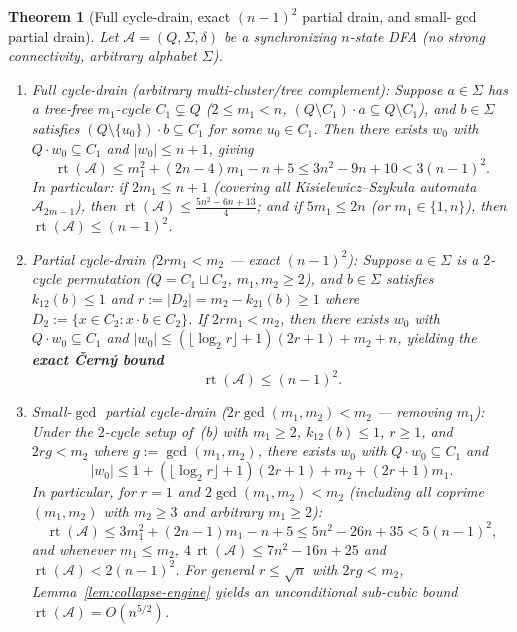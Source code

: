 \documentclass[11pt,a4paper]{article}
\newtheorem{theorem}{Theorem}[section]
\theoremstyle{definition}
\theoremstyle{remark}
\newcommand{\rt}{\operatorname{rt}}
\newcommand{\cA}{\mathcal{A}}
\begin{document}
\begin{theorem}[Full cycle-drain, exact $(n-1)^2$ partial drain, and small-$\gcd$ partial drain]
\label{thm:drain}
Let $\cA = (Q, \Sigma, \delta)$ be a synchronizing $n$-state DFA (no strong connectivity, arbitrary alphabet $\Sigma$).
\begin{enumerate}[label=(\alph*)]
  \item \emph{Full cycle-drain (arbitrary multi-cluster/tree complement):} Suppose $a \in \Sigma$ has a tree-free $m_1$-cycle $C_1 \subsetneq Q$ ($2 \le m_1 < n$, $(Q \setminus C_1) \cdot a \subseteq Q \setminus C_1$), and $b \in \Sigma$ satisfies $(Q \setminus \{u_0\}) \cdot b \subseteq C_1$ for some $u_0 \in C_1$. Then there exists $w_0$ with $Q \cdot w_0 \subseteq C_1$ and $|w_0| \le n + 1$, giving
  \[
    \rt(\cA) \le m_1^2 + (2n - 4)m_1 - n + 5 \le 3n^2 - 9n + 10 < 3(n-1)^2.
  \]
  In particular: if $2m_1 \le n + 1$ (covering all Kisielewicz--Szyku\l a automata $\cA_{2m-1}$), then $\rt(\cA) \le \frac{5n^2 - 6n + 13}{4}$; and if $5m_1 \le 2n$ (or $m_1 \in \{1, n\}$), then $\rt(\cA) \le (n-1)^2$.

  \item \emph{Partial cycle-drain ($2r m_1 < m_2$ --- exact $(n-1)^2$):} Suppose $a \in \Sigma$ is a $2$-cycle permutation ($Q = C_1 \sqcup C_2$, $m_1, m_2 \ge 2$), and $b \in \Sigma$ satisfies $k_{12}(b) \le 1$ and $r := |D_2| = m_2 - k_{21}(b) \ge 1$ where $D_2 := \{x \in C_2 : x \cdot b \in C_2\}$. If $2r m_1 < m_2$, then there exists $w_0$ with $Q \cdot w_0 \subseteq C_1$ and $|w_0| \le (\lfloor\log_2 r\rfloor + 1)(2r + 1) + m_2 + n$, yielding the \textbf{exact \v{C}ern\'y bound}
  \[
    \rt(\cA) \le (n - 1)^2.
  \]

  \item \emph{Small-$\gcd$ partial cycle-drain ($2r\gcd(m_1, m_2) < m_2$ --- removing $m_1$):} Under the $2$-cycle setup of~(b) with $m_1 \ge 2$, $k_{12}(b) \le 1$, $r \ge 1$, and $2r g < m_2$ where $g := \gcd(m_1, m_2)$, there exists $w_0$ with $Q \cdot w_0 \subseteq C_1$ and
  \[
    |w_0| \le 1 + (\lfloor \log_2 r \rfloor + 1)(2r + 1) + m_2 + (2r + 1)m_1.
  \]
  In particular, for $r = 1$ and $2\gcd(m_1, m_2) < m_2$ (including all coprime $(m_1, m_2)$ with $m_2 \ge 3$ and arbitrary $m_1 \ge 2$):
  \[
    \rt(\cA) \le 3m_1^2 + (2n - 1)m_1 - n + 5 \le 5n^2 - 26n + 35 < 5(n-1)^2,
  \]
  and whenever $m_1 \le m_2$, $4\,\rt(\cA) \le 7n^2 - 16n + 25$ and $\rt(\cA) < 2(n-1)^2$. For general $r \le \sqrt{n}$ with $2r g < m_2$, Lemma~\ref{lem:collapse-engine} yields an unconditional sub-cubic bound $\rt(\cA) = O(n^{5/2})$.
\end{enumerate}
\end{theorem}
\end{document}

